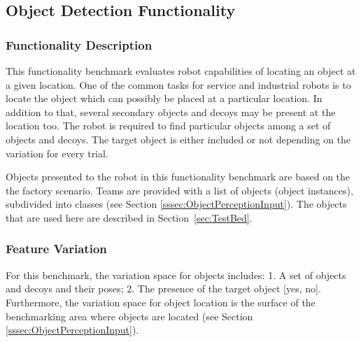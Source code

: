 
\subsection{Object Detection Functionality}
\label{ssec:ObjectPerception}

\subsubsection{Functionality Description}
\label{sssec:ObjectPerceptionDescription}

This functionality benchmark evaluates robot capabilities of locating an object at a given location. One of the common tasks for service and industrial robots is to locate the object which can possibly be placed at a particular location. 
In addition to that, several secondary objects and decoys may be present at the location too. 
The robot is required to find particular objects among a set of objects and decoys. 
The target object is either included or not depending on the variation for every trial.

Objects presented to the robot in this functionality benchmark are based on the the \erlir factory scenario.
Teams are provided with a list of objects (object instances), subdivided into classes (see Section \ref{sssec:ObjectPerceptionInput}).
The objects that are used here are described in Section~\ref{sec:TestBed}.

\subsubsection{Feature Variation}
\label{sssec:ObjectPerceptionVariation}

For this benchmark, the variation space for objects includes: 1. A set of objects and decoys and their poses; 2. The presence of the target object [yes, no].
Furthermore, the variation space for object location is the surface of the benchmarking area where objects are located (see Section \ref{sssec:ObjectPerceptionInput}).

